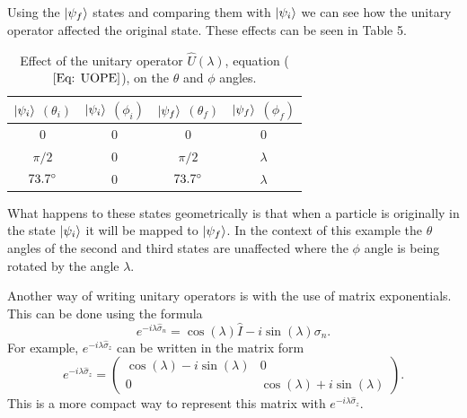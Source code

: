 \documentclass[twocolumn]{article}
\begin{document}
Using the $\ket{\psi_f}$ states and comparing them with $\ket{\psi_i}$ we can see how the unitary operator affected the original state. These effects can be seen in Table 5.
\begin{table}[ht]
    \centering
    \begin{tabular}{|c|c|c|c|}
         \hline $\ket{\psi_i}$ $(\theta_i)$& $\ket{\psi_i}$ $(\phi_i)$& $\ket{\psi_f}$ $(\theta_f)$& $\ket{\psi_f}$ $(\phi_f)$ \\
         \hline 0 & 0 & 0 & 0 \\
         \hline $\pi/2$ & 0 & $\pi/2$ & $\lambda$ \\
         \hline $73.7\degree$ & $0$ & $73.7\degree$ & $\lambda$ \\
         \hline
    \end{tabular}
    \caption{\footnotesize{Effect of the unitary operator $\hat{U}(\lambda)$, equation ($\ref{Eq: UOPE}$), on the $\theta$ and $\phi$ angles.}}
    \label{Tab: UOOFS}
\end{table}
\par \noindent
What happens to these states geometrically is that when a particle is originally in the state $\ket{\psi_i}$ it will be mapped to $\ket{\psi_f}$. In the context of this example the $\theta$ angles of the second and third states are unaffected where the $\phi$ angle is being rotated by the angle $\lambda$. 

Another way of writing unitary operators is with the use of matrix exponentials. This can be done using the formula
\begin{equation}\label{Eq: UOME}
e^{-i\lambda\hat{\sigma}_n}=\cos{(\lambda)}\hat{I}-i\sin{(\lambda)}\hat{\sigma_n}.
\end{equation}
For example, $e^{-i\lambda\hat{\sigma}_z}$ can be written in the matrix form
\begin{equation}\label{Eq: UOMF}
e^{-i\lambda\hat{\sigma}_z}=
\begin{pmatrix}
\cos{(\lambda)}-i\sin{(\lambda)} & 0 \\
0 & \cos{(\lambda)}+i\sin{(\lambda)}
\end{pmatrix}.
\end{equation}
This is a more compact way to represent this matrix with $e^{-i\lambda\hat{\sigma}_z}$.
\end{document}
